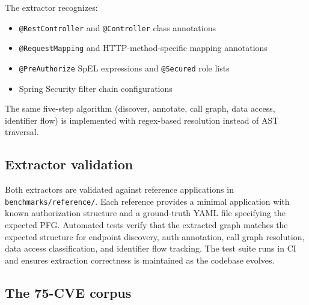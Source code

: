 The extractor recognizes:
\begin{itemize}
    \item \texttt{@RestController} and \texttt{@Controller} class
    annotations
    \item \texttt{@Request\-Mapping} and HTTP-method-specific mapping
    annotations
    \item \texttt{@PreAuthorize} SpEL expressions and \texttt{@Secured}
    role lists
    \item Spring Security filter chain configurations
\end{itemize}
The same five-step algorithm (discover, annotate, call graph, data access,
identifier flow) is implemented with regex-based resolution instead of AST
traversal.

\subsection{Extractor validation}
\label{sec:det-validation}

Both extractors are validated against reference applications in
\texttt{benchmarks/reference/}. Each reference provides a minimal
application with known authorization structure and a ground-truth YAML file
specifying the expected PFG. Automated tests verify that the extracted graph
matches the expected structure for endpoint discovery, auth annotation,
call graph resolution, data access classification, and identifier flow
tracking. The test suite runs in CI and ensures extraction correctness is
maintained as the codebase evolves.

\subsection{The 75-CVE corpus}
\label{sec:det-corpus}

